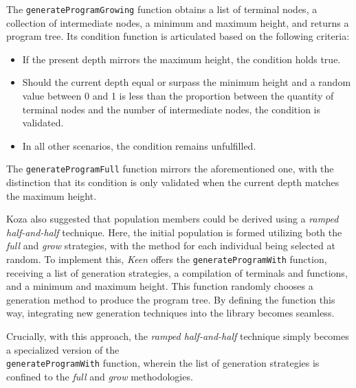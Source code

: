   The \texttt{generateProgramGrowing} function obtains a list of terminal nodes, 
  a collection of intermediate nodes, a minimum and maximum height, and returns 
  a program tree. Its condition function is articulated based on the following 
  criteria:

  \begin{itemize}
    \item If the present depth mirrors the maximum height, the condition holds 
      true.
    \item Should the current depth equal or surpass the minimum height and a 
      random value between 0 and 1 is less than the proportion between the 
      quantity of terminal nodes and the number of intermediate nodes, the 
      condition is validated.
    \item In all other scenarios, the condition remains unfulfilled.
  \end{itemize}

  The \texttt{generateProgramFull} function mirrors the aforementioned one, with 
  the distinction that its condition is only validated when the current depth 
  matches the maximum height.

  Koza also suggested that population members could be derived using a 
  \textit{ramped half-and-half} technique. Here, the initial population is 
  formed utilizing both the \textit{full} and \textit{grow} strategies, with the 
  method for each individual being selected at random. To implement this, 
  \textit{Keen} offers the \texttt{generateProgramWith} function, receiving a 
  list of generation strategies, a compilation of terminals and functions, and a 
  minimum and maximum height. This function randomly chooses a generation method 
  to produce the program tree. By defining the function this way, integrating 
  new generation techniques into the library becomes seamless.

  Crucially, with this approach, the \textit{ramped half-and-half} technique 
  simply becomes a specialized version of the \\
  \texttt{generateProgramWith} function, wherein the list of generation 
  strategies is confined to the \textit{full} and \textit{grow} methodologies.
  